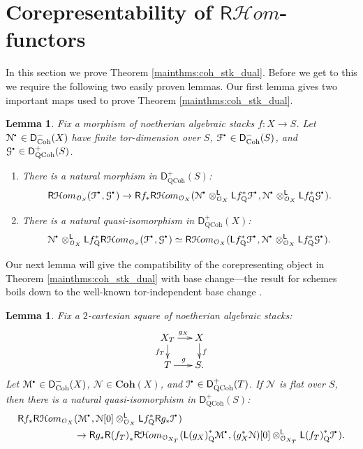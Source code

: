\documentclass{amsart}
\theoremstyle{plain}
\newtheorem{lem}[thm]{Lemma}
\theoremstyle{definition}
\theoremstyle{remark}
\numberwithin{equation}{section}
\newcommand{\Orb}{\mathcal{O}}
\newcommand{\COH}[1]{\mathbf{Coh}({#1})}
\newcommand{\RDERF}{\mathsf{R}}
\newcommand{\LDERF}{\mathsf{L}}
\newcommand{\DCAT}{\mathsf{D}}
\newcommand{\SHom}{\mathcal{H}om}
\newcommand{\SRHom}{\RDERF\SHom}
\newcommand{\tensor}{\otimes}
\newcommand{\homotopic}{\simeq}
\newcommand{\shv}[1]{\mathcal{{#1}}}
\newcommand{\QCPSH}[1]{{#1}_{*}}
\newcommand{\QCPBK}[1]{{#1}_{\mathrm{Q}}^*}
\newcommand{\DQCOH}{\DCAT_{\mathrm{QCoh}}}
\newcommand{\DCOH}{\DCAT_{\mathrm{Coh}}}
\newcommand{\sbt}{\,\begin{picture}(-1,-1)(0,-2)\circle*{1.5}\end{picture}\ }
\newcommand{\cplx}[1]{\shv{{#1}}^{\sbt}}
\begin{document}
\section{Corepresentability of $\SRHom$-functors}
In this section we prove Theorem \ref{mainthms:coh_stk_dual}. Before
we get to this we require the
following two easily proven lemmas. Our first lemma gives two
important maps used to prove Theorem \ref{mainthms:coh_stk_dual}.
\begin{lem}\label{lem:big_one}
  Fix a morphism of noetherian algebraic stacks $f : X \to S$. Let
  $\cplx{N}\in \DCOH^-(X)$ have finite tor-dimension over $S$,
  $\cplx{F} \in \DCOH^-(S)$, and $\cplx{G} \in \DQCOH^+(S)$. 
  \begin{enumerate}
  \item \label{item:big_one:A}  There is a natural morphism in $\DQCOH^+(S)$:
    \[
    \SRHom_{\Orb_S}(\cplx{F},\cplx{G}) \to \RDERF
    f_*\SRHom_{\Orb_X}(\cplx{N}\tensor_{\Orb_X}^\LDERF \LDERF
    \QCPBK{f}\cplx{F}, \cplx{N}\tensor_{\Orb_X}^\LDERF \LDERF
    \QCPBK{f}\cplx{G}).
    \]
  \item \label{item:big_one:B} There is a natural quasi-isomorphism in
    $\DQCOH^+(X)$:
    \[
    \cplx{N}\tensor_{\Orb_X}^{\LDERF} \LDERF
    \QCPBK{f}\SRHom_{\Orb_S}(\cplx{F},\cplx{G}) \homotopic
    \SRHom_{\Orb_X}(\LDERF \QCPBK{f}
    \cplx{F},\cplx{N}\tensor_{\Orb_X}^{\LDERF} \LDERF \QCPBK{f}
    \cplx{G}).
    \]
  \end{enumerate}
\end{lem}
Our next lemma will give the compatibility of the corepresenting
object in Theorem \ref{mainthms:coh_stk_dual} with base change---the
result for schemes boils down to the well-known tor-independent base
change \cite[Thm.~8.3.2]{MR2222646}.
\begin{lem}\label{lem:base_change} 
Fix a $2$-cartesian square of noetherian algebraic stacks:
\[
\xymatrix@-0.8pc{X_T \ar[r]^{g_X} \ar[d]_{f_T} & X \ar[d]^{f} \\ T \ar[r]^{g}
& S.}
\]
Let $\cplx{M} \in \DCOH^-(X)$, $\shv{N} \in \COH{X}$, and $\cplx{I}
\in \DQCOH^+(T)$. If $\shv{N}$ is flat over $S$, then there is a natural
quasi-isomorphism in $\DQCOH^+(S)$:
\begin{align*}
  \RDERF \QCPSH{f} \SRHom_{\Orb_X}&(\cplx{M},\shv{N}[0]
  \tensor_{\Orb_X}^\LDERF \LDERF \QCPBK{f} \RDERF g_*\cplx{I})\\
  &\to \RDERF
  g_*\RDERF \QCPSH{(f_T)}\SRHom_{\Orb_{X_T}}(\LDERF
  \QCPBK{(g_X)}\cplx{M},
  (g_X^*\shv{N})[0]\tensor^{\LDERF}_{\Orb_{X_T}}
  \LDERF \QCPBK{(f_T)} \cplx{I} ).
\end{align*}
\end{lem}
\end{document}
